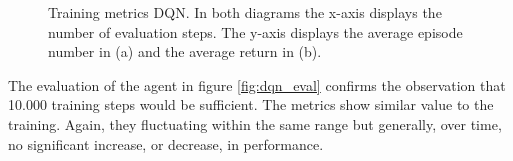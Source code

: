 \begin{figure}[H]
	\centering
	\qquad
	\caption[DQN Training]{Training metrics DQN. In both diagrams the x-axis displays the number of evaluation steps. The y-axis displays the average episode number in (a) and the average return in (b).}	
	\label{fig:dqn_train}
\end{figure}


The evaluation of the agent in figure \ref{fig:dqn_eval} confirms the observation that 10.000 training steps would be sufficient. The metrics show similar value to the training. Again, they fluctuating within the same range but generally, over time, no significant increase, or decrease, in performance.

